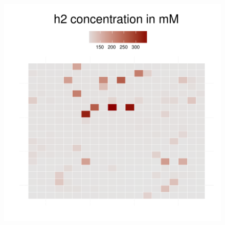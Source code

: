 \begin{figure}[h]
{\begin{minipage}[t]{0.3\textwidth}
  \end{minipage}
  \begin{minipage}[t]{0.3\textwidth}
    \includegraphics[width=\textwidth]{../results/ecoli_beijerinckii_20x20_seed5147_h275.pdf}
  \end{minipage}
  }
\end{figure}
